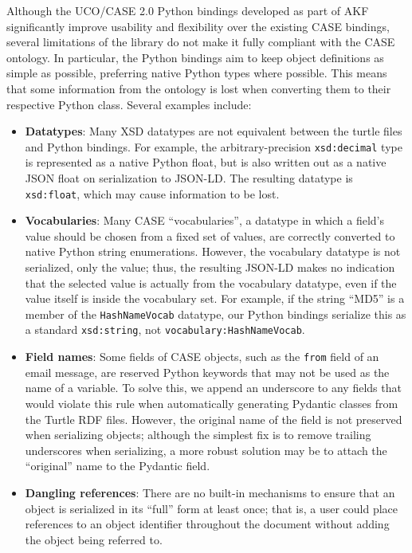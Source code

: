 Although the UCO/CASE 2.0 Python bindings developed as part of AKF
significantly improve usability and flexibility over the existing CASE
bindings, several limitations of the library do not make it fully
compliant with the CASE ontology. In particular, the Python bindings aim
to keep object definitions as simple as possible, preferring native
Python types where possible. This means that some information from the
ontology is lost when converting them to their respective Python class.
Several examples include:

\begin{itemize}
\tightlist
\item
  \textbf{Datatypes}: Many XSD datatypes are not equivalent between the
  turtle files and Python bindings. For example, the arbitrary-precision
  \passthrough{\lstinline!xsd:decimal!} type is represented as a native
  Python float, but is also written out as a native JSON float on
  serialization to JSON-LD. The resulting datatype is
  \passthrough{\lstinline!xsd:float!}, which may cause information to be
  lost.
\item
  \textbf{Vocabularies}: Many CASE ``vocabularies'', a datatype in which
  a field's value should be chosen from a fixed set of values, are
  correctly converted to native Python string enumerations. However, the
  vocabulary datatype is not serialized, only the value; thus, the
  resulting JSON-LD makes no indication that the selected value is
  actually from the vocabulary datatype, even if the value itself is
  inside the vocabulary set. For example, if the string ``MD5'' is a
  member of the \passthrough{\lstinline!HashNameVocab!} datatype, our
  Python bindings serialize this as a standard
  \passthrough{\lstinline!xsd:string!}, not
  \passthrough{\lstinline!vocabulary:HashNameVocab!}.
\item
  \textbf{Field names}: Some fields of CASE objects, such as the
  \passthrough{\lstinline!from!} field of an email message, are reserved
  Python keywords that may not be used as the name of a variable. To
  solve this, we append an underscore to any fields that would violate
  this rule when automatically generating Pydantic classes from the
  Turtle RDF files. However, the original name of the field is not
  preserved when serializing objects; although the simplest fix is to
  remove trailing underscores when serializing, a more robust solution
  may be to attach the ``original'' name to the Pydantic field.
\item
  \textbf{Dangling references}: There are no built-in mechanisms to
  ensure that an object is serialized in its ``full'' form at least
  once; that is, a user could place references to an object identifier
  throughout the document without adding the object being referred to.
\end{itemize}

